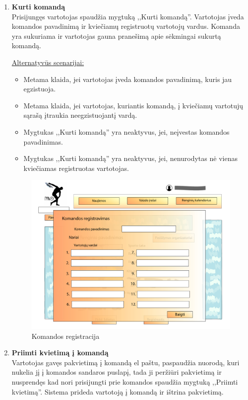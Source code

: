 \documentclass{VUMIFPSkursinis}
\begin{document}
\begin{enumerate} [label = \textbf{U\arabic*.}]
			\item \textbf{Kurti komandą} \\
				Prisijungęs vartotojas spaudžia mygtuką ,,Kurti komandą''. Vartotojas įveda komandos pavadinimą ir kviečiamų registruotų vartotojų vardus. Komanda yra sukuriama ir vartotojas gauna pranešimą apie sėkmingai sukurtą komandą.
			
				\underline{Alternatyvūs scenarijai:}
				\begin{itemize}
					\item Metama klaida, jei vartotojas įveda komandos pavadinimą, kuris jau egzistuoja.
					\item Metama klaida, jei vartotojas, kuriantis komandą, į kviečiamų vartotujų sąrašą įtraukia neegzistuojantį vardą.
					\item Mygtukas ,,Kurti komandą'' yra neaktyvus, jei, neįvestas komandos pavadinimas.
					\item Mygtukas ,,Kurti komandą'' yra neaktyvus, jei, nenurodytas nė vienas kviečiamas registruotas vartotojas.
				\end{itemize}

				\begin{figure}[H]
					\centering
					\includegraphics[width=\textwidth]{img/PSI4/renginioPuslapisRegistruotiKomanda-01.jpg}
					\caption{Komandos registracija}
					\label{fig:uzd_registruotiKomanda}
				\end{figure}

			\item \textbf{Priimti kvietimą į komandą} \\
					Vartotojas gavęs pakvietimą į komandą el paštu, paspaudžia nuorodą, kuri nukelia jį į komandos sandaros puslapį, tada ji peržiūri pakvietimą ir nusprendęs kad nori prisijungti prie komandos spaudžia mygtuką ,,Priimti kvietimą''. Sistema prideda vartotoją į komandą ir ištrina pakvietimą.


\end{enumerate}
\end{document}
